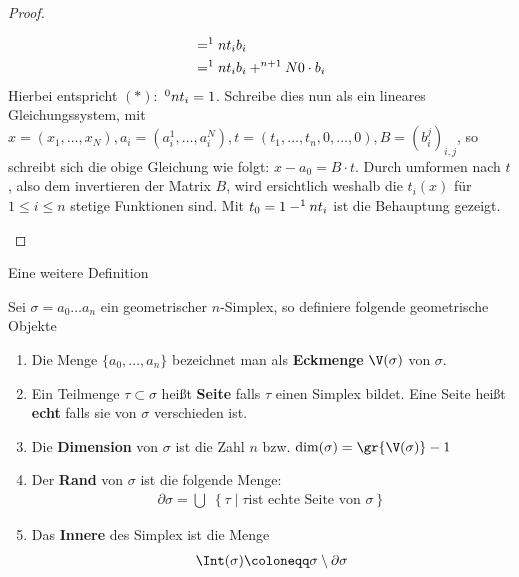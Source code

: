 \begin{Lem}
\begin{proof}
\begin{description}
\begin{align*}
                &= \sp{1}{n} t_i b_i\\
                &= \sp{1}{n} t_i b_i + \sp{n+1}{N} 0 \cdot b_i
      \end{align*}
      Hierbei entspricht $(*):$ $\sp{0}{n} t_i = 1$. Schreibe dies nun als
      ein lineares Gleichungssystem, mit
      $x=(x_1,\ldots,x_N),a_i=(a_i^1,\ldots,a_i^N),t=(t_1,\ldots,t_n,0,\ldots,0),B=(b_i^j)_{i,j}$,
      so schreibt sich die obige Gleichung wie folgt:
      $x-a_0 = B\cdot t$. Durch umformen nach $t$, also dem
      invertieren der Matrix $B$, wird ersichtlich weshalb die $t_i(x)$
      für $1 \leq i \leq n$ stetige Funktionen sind. Mit
      $t_0 = 1 - \sp{1}{n} t_i$ ist die Behauptung gezeigt.
    \end{description}
  \end{proof}
\end{Lem}

Eine weitere Definition

\begin{Def}
  Sei $\sigma = a_0 \ldots a_n$ ein geometrischer $n$-Simplex, so
  definiere folgende geometrische Objekte
  \begin{enumerate}[\textbullet]%
  \item Die Menge $\{ a_0 , \ldots , a_n \}$ bezeichnet man als
    \textbf{Eckmenge} $\V(\sigma)$ von $\sigma$.
  \item Ein Teilmenge $\tau \subset \sigma$ heißt \textbf{Seite} falls
    $\tau$ einen Simplex bildet. Eine Seite heißt \textbf{echt} falls
    sie von $\sigma$ verschieden ist.
	\item Die \textbf{Dimension} von $\sigma$ ist die Zahl $n$ bzw. 
		$\dim(\sigma) = \gr{\V(\sigma)} - 1$
  \item Der \textbf{Rand} von $\sigma$ ist die folgende Menge:
    \begin{gather*}
      \partial\sigma = \bigcup \; \left\{ \tau \; \Big| \; \tau \text{
          ist echte Seite von } \sigma \right\}
    \end{gather*}
  \item Das \textbf{Innere} des Simplex ist die Menge
    \begin{gather*}
    	\Int(\sigma) \coloneqq \sigma \setminus \partial\sigma
    \end{gather*}
  \end{enumerate}
\end{Def}

